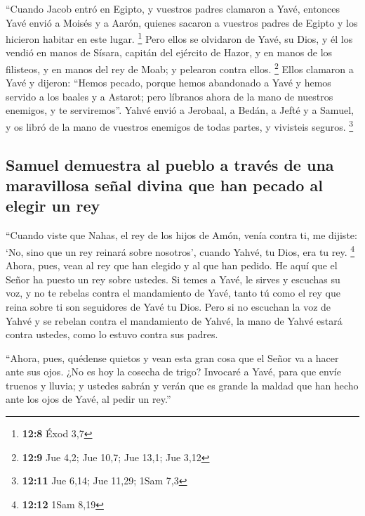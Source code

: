  ``Cuando Jacob entró en Egipto, y vuestros padres
clamaron a Yavé, entonces Yavé envió a Moisés y a Aarón, quienes sacaron
a vuestros padres de Egipto y los hicieron habitar en este lugar.
\footnote{\textbf{12:8} Éxod 3,7}  Pero ellos se olvidaron
de Yavé, su Dios, y él los vendió en manos de Sísara, capitán del
ejército de Hazor, y en manos de los filisteos, y en manos del rey de
Moab; y pelearon contra ellos. \footnote{\textbf{12:9} Jue 4,2; Jue
  10,7; Jue 13,1; Jue 3,12}  Ellos clamaron a Yavé y
dijeron: ``Hemos pecado, porque hemos abandonado a Yavé y hemos servido
a los baales y a Astarot; pero líbranos ahora de la mano de nuestros
enemigos, y te serviremos''.  Yahvé envió a Jerobaal, a
Bedán, a Jefté y a Samuel, y os libró de la mano de vuestros enemigos de
todas partes, y vivisteis seguros. \footnote{\textbf{12:11} Jue 6,14;
  Jue 11,29; 1Sam 7,3}

\hypertarget{samuel-demuestra-al-pueblo-a-travuxe9s-de-una-maravillosa-seuxf1al-divina-que-han-pecado-al-elegir-un-rey}{%
\subsection{Samuel demuestra al pueblo a través de una maravillosa señal
divina que han pecado al elegir un
rey}\label{samuel-demuestra-al-pueblo-a-travuxe9s-de-una-maravillosa-seuxf1al-divina-que-han-pecado-al-elegir-un-rey}}

 ``Cuando viste que Nahas, el rey de los hijos de Amón,
venía contra ti, me dijiste: `No, sino que un rey reinará sobre
nosotros', cuando Yahvé, tu Dios, era tu rey. \footnote{\textbf{12:12}
  1Sam 8,19}  Ahora, pues, vean al rey que han elegido y
al que han pedido. He aquí que el Señor ha puesto un rey sobre ustedes.
 Si temes a Yavé, le sirves y escuchas su voz, y no te
rebelas contra el mandamiento de Yavé, tanto tú como el rey que reina
sobre ti son seguidores de Yavé tu Dios.  Pero si no
escuchan la voz de Yahvé y se rebelan contra el mandamiento de Yahvé, la
mano de Yahvé estará contra ustedes, como lo estuvo contra sus padres.

 ``Ahora, pues, quédense quietos y vean esta gran cosa
que el Señor va a hacer ante sus ojos.  ¿No es hoy la
cosecha de trigo? Invocaré a Yavé, para que envíe truenos y lluvia; y
ustedes sabrán y verán que es grande la maldad que han hecho ante los
ojos de Yavé, al pedir un rey.''


